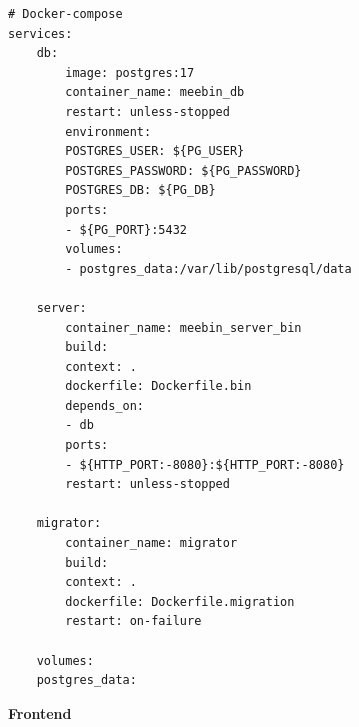 \documentclass[diploma]{SCWorks}
\begin{document}
\begin{verbatim}
# Docker-compose
services:
    db:
        image: postgres:17
        container_name: meebin_db
        restart: unless-stopped
        environment:
        POSTGRES_USER: ${PG_USER}
        POSTGRES_PASSWORD: ${PG_PASSWORD}
        POSTGRES_DB: ${PG_DB}
        ports: 
        - ${PG_PORT}:5432
        volumes:
        - postgres_data:/var/lib/postgresql/data
    
    server:
        container_name: meebin_server_bin
        build:
        context: .
        dockerfile: Dockerfile.bin
        depends_on:
        - db
        ports:
        - ${HTTP_PORT:-8080}:${HTTP_PORT:-8080}
        restart: unless-stopped
    
    migrator:
        container_name: migrator
        build:
        context: .
        dockerfile: Dockerfile.migration
        restart: on-failure
    
    volumes:
    postgres_data:
\end{verbatim}

\begin{center}
    \textbf{Frontend}    
\end{center}
\end{document}
